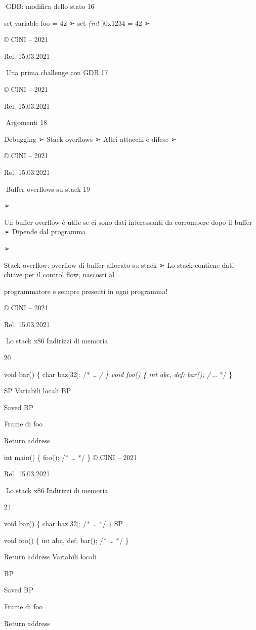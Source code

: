 \documentclass[11pt,a4paper]{article}
\begin{document}
GDB: modifica dello stato 16

set variable foo = 42 ➢ set \emph{(int })0x1234 = 42 ➢

© CINI -- 2021

Rel. 15.03.2021

Una prima challenge con GDB 17

© CINI -- 2021

Rel. 15.03.2021

Argomenti 18

Debugging ➢ Stack overflows ➢ Altri attacchi e difese ➢

© CINI -- 2021

Rel. 15.03.2021

Buffer overflows su stack 19

➢

Un buffer overflow è utile se ci sono dati interessanti da corrompere
dopo il buffer ➢ Dipende dal programma

➢

Stack overflow: overflow di buffer allocato su stack ➢ Lo stack contiene
dati chiave per il control flow, nascosti al

programmatore e sempre presenti in ogni programma!

© CINI -- 2021

Rel. 15.03.2021

Lo stack x86 Indirizzi di memoria

20

void bar() \{ char baz{[}32{]}; /* \ldots{} \emph{/ \} void foo() \{ int
abc, def; bar(); /} \ldots{} */ \}

SP Variabili locali BP

Saved BP

Frame di foo

Return address

int main() \{ foo(); /* \ldots{} */ \} © CINI -- 2021

Rel. 15.03.2021

Lo stack x86 Indirizzi di memoria

21

void bar() \{ char baz{[}32{]}; /* \ldots{} */ \} SP

void foo() \{ int abc, def; bar(); /* \ldots{} */ \}

Return address Variabili locali

BP

Saved BP

Frame di foo

Return address
\end{document}
